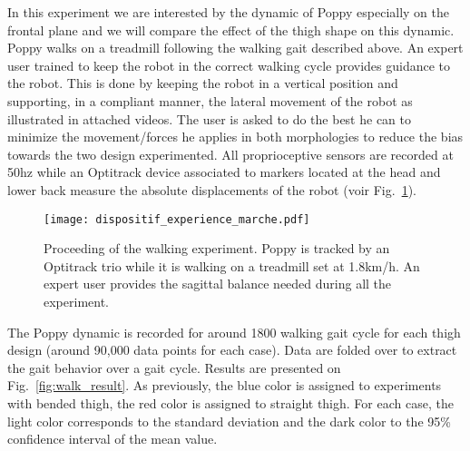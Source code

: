 In this experiment we are interested by the dynamic of Poppy especially on the frontal plane and we will compare the effect of the thigh shape on this dynamic. Poppy walks on a treadmill following the walking gait described above. An expert user trained to keep the robot in the correct walking cycle provides guidance to the robot. This is done by keeping the robot in a vertical position and supporting, in a compliant manner, the lateral movement of the robot as illustrated in attached videos. The user is asked to do the best he can to minimize the movement/forces he applies in both morphologies to reduce the bias towards the two design experimented. All proprioceptive sensors are recorded at 50hz while an Optitrack device associated to markers located at the head and lower back measure the absolute displacements of the robot (voir Fig.~\ref{fig:walking_experiment}).

\begin{figure}[!h]
    \centering
    \texttt{[image: dispositif\_experience\_marche.pdf]}
    \caption{Proceeding of the walking experiment.
    Poppy is tracked by an Optitrack trio while it is walking on a treadmill set at 1.8km/h.
    An expert user provides the sagittal balance needed during all the experiment.}
    \label{fig:walking_experiment}
\end{figure}

The Poppy dynamic is recorded for around 1800 walking gait cycle for each thigh design (around 90,000 data points for each case). Data are folded over to extract the gait behavior over a gait cycle. Results are presented on Fig.~\ref{fig:walk_result}. As previously, the blue color is assigned to experiments with bended thigh, the red color is assigned to straight thigh. For each case, the light color corresponds to the standard deviation and the dark color to the 95\% confidence interval of the mean value.

